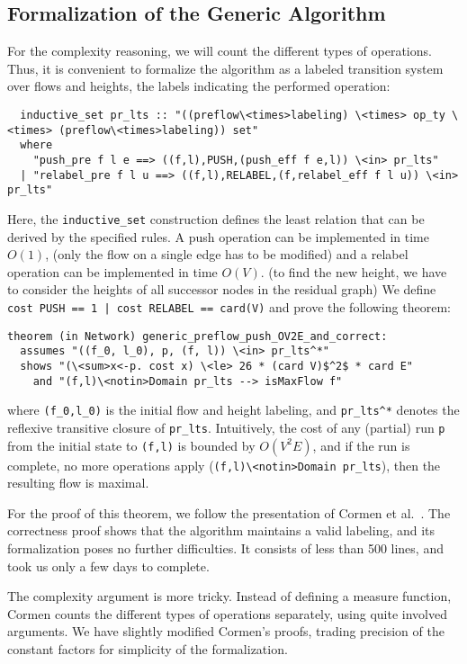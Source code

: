 \documentclass[smallcondensed]{svjour3}     %
\newcommand{\isai}{\lstinline[language=isabelle,basicstyle=\normalsize\ttfamily\slshape]}
\begin{document}
\subsection{Formalization of the Generic Algorithm}
For the complexity reasoning, we will count the different types of operations. Thus, it is convenient to formalize the algorithm as a labeled transition system
over flows and heights, the labels indicating the performed operation:
\begin{lstlisting}
  inductive_set pr_lts :: "((preflow\<times>labeling) \<times> op_ty \<times> (preflow\<times>labeling)) set" 
  where
    "push_pre f l e ==> ((f,l),PUSH,(push_eff f e,l)) \<in> pr_lts"
  | "relabel_pre f l u ==> ((f,l),RELABEL,(f,relabel_eff f l u)) \<in> pr_lts"
\end{lstlisting}  
Here, the \isai{inductive_set} construction defines the least relation that can be derived by the specified rules. 
A push operation can be implemented in time $O(1)$, (only the flow on a single edge has to be modified) and a relabel operation can be implemented in time $O(V)$.
(to find the new height, we have to consider the heights of all successor nodes in the residual graph) We define 
\isai{cost PUSH == 1 | cost RELABEL == card(V)} and prove the following theorem:
\begin{lstlisting}
theorem (in Network) generic_preflow_push_OV2E_and_correct:
  assumes "((f_0, l_0), p, (f, l)) \<in> pr_lts^*" 
  shows "(\<sum>x<-p. cost x) \<le> 26 * (card V)$^2$ * card E"
    and "(f,l)\<notin>Domain pr_lts --> isMaxFlow f"
\end{lstlisting}  
where \isai$(f_0,l_0)$ is the initial flow and height labeling, and \isai{pr_lts^*} denotes the reflexive transitive closure of \isai{pr_lts}. 
Intuitively, the cost of any (partial) run \isai$p$ from the initial state to \isai$(f,l)$ is bounded by $O(V^2E)$, and if the 
run is complete, \ie no more operations apply (\isai$(f,l)\<notin>Domain pr_lts$), then the resulting flow is maximal. 

For the proof of this theorem, we follow the presentation of Cormen et al.~\cite{CLRS09}.
The correctness proof shows that the algorithm maintains a valid labeling, and its formalization poses no further difficulties. 
It consists of less than 500 lines, and took us only a few days to complete.

The complexity argument is more tricky. Instead of defining a measure function,
Cormen counts the different types of operations separately, using quite involved arguments.
We have slightly modified Cormen's proofs, trading precision of the constant factors for simplicity of the formalization. 
\end{document}
